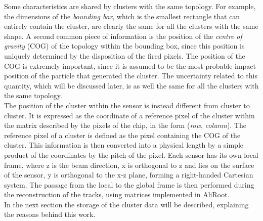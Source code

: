 Some characteristics are shared by clusters with the same topology. For example, the dimensions of the \textit{bounding box}, which is the smallest rectangle that can entirely contain the cluster, are clearly the same for all the clusters with the same shape. A second common piece of information is the position of the \textit{centre of gravity} (COG) of the topology within the bounding box, since this position is uniquely determined by the disposition of the fired pixels. The position of the COG is extremely important, since it is assumed to be the most probable impact position of the particle that generated the cluster. The uncertainty related to this quantity, which will be discussed later, is as well the same for all the clusters with the same topology.\\
The position of the cluster within the sensor is instead different from cluster to cluster. It is expressed as the coordinate of a reference pixel of the cluster within the matrix described by the pixels of the chip, in the form (\textit{row}, \textit{column}). The reference pixel of a cluster is defined as the pixel containing the COG of the cluster. This information is then converted into a physical length by a simple product of the coordinates by the pitch of the pixel. Each sensor has its own local frame, where z is the beam direction, x is orthogonal to z and lies on the surface of the sensor, y is orthogonal to the x-z plane, forming a right-handed Cartesian system. The passage from the local to the global frame is then performed during the reconstruction of the tracks, using matrices implemented in AliRoot.\\
In the next section the storage of the cluster data will be described, explaining the reasons behind this work.
